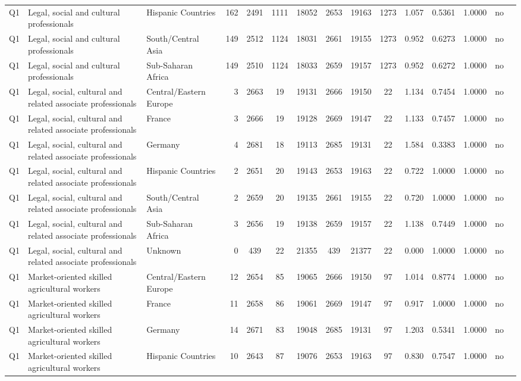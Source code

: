 \begin{longtable}{lllrcccccccccll}
Q1 & Legal, social and cultural professionals & Hispanic Countries & 162 & 2491 & 1111 & 18052 & 2653 & 19163 & 1273 & 1.057 & 0.5361 & 1.0000 & no \\
Q1 & Legal, social and cultural professionals & South/Central Asia & 149 & 2512 & 1124 & 18031 & 2661 & 19155 & 1273 & 0.952 & 0.6273 & 1.0000 & no \\
Q1 & Legal, social and cultural professionals & Sub-Saharan Africa & 149 & 2510 & 1124 & 18033 & 2659 & 19157 & 1273 & 0.952 & 0.6272 & 1.0000 & no \\
Q1 & Legal, social, cultural and related associate professionals & Central/Eastern Europe & 3 & 2663 & 19 & 19131 & 2666 & 19150 & 22 & 1.134 & 0.7454 & 1.0000 & no \\
Q1 & Legal, social, cultural and related associate professionals & France & 3 & 2666 & 19 & 19128 & 2669 & 19147 & 22 & 1.133 & 0.7457 & 1.0000 & no \\
Q1 & Legal, social, cultural and related associate professionals & Germany & 4 & 2681 & 18 & 19113 & 2685 & 19131 & 22 & 1.584 & 0.3383 & 1.0000 & no \\
Q1 & Legal, social, cultural and related associate professionals & Hispanic Countries & 2 & 2651 & 20 & 19143 & 2653 & 19163 & 22 & 0.722 & 1.0000 & 1.0000 & no \\
Q1 & Legal, social, cultural and related associate professionals & South/Central Asia & 2 & 2659 & 20 & 19135 & 2661 & 19155 & 22 & 0.720 & 1.0000 & 1.0000 & no \\
Q1 & Legal, social, cultural and related associate professionals & Sub-Saharan Africa & 3 & 2656 & 19 & 19138 & 2659 & 19157 & 22 & 1.138 & 0.7449 & 1.0000 & no \\
Q1 & Legal, social, cultural and related associate professionals & Unknown & 0 & 439 & 22 & 21355 & 439 & 21377 & 22 & 0.000 & 1.0000 & 1.0000 & no \\
Q1 & Market-oriented skilled agricultural workers & Central/Eastern Europe & 12 & 2654 & 85 & 19065 & 2666 & 19150 & 97 & 1.014 & 0.8774 & 1.0000 & no \\
Q1 & Market-oriented skilled agricultural workers & France & 11 & 2658 & 86 & 19061 & 2669 & 19147 & 97 & 0.917 & 1.0000 & 1.0000 & no \\
Q1 & Market-oriented skilled agricultural workers & Germany & 14 & 2671 & 83 & 19048 & 2685 & 19131 & 97 & 1.203 & 0.5341 & 1.0000 & no \\
Q1 & Market-oriented skilled agricultural workers & Hispanic Countries & 10 & 2643 & 87 & 19076 & 2653 & 19163 & 97 & 0.830 & 0.7547 & 1.0000 & no \\

\end{longtable}
